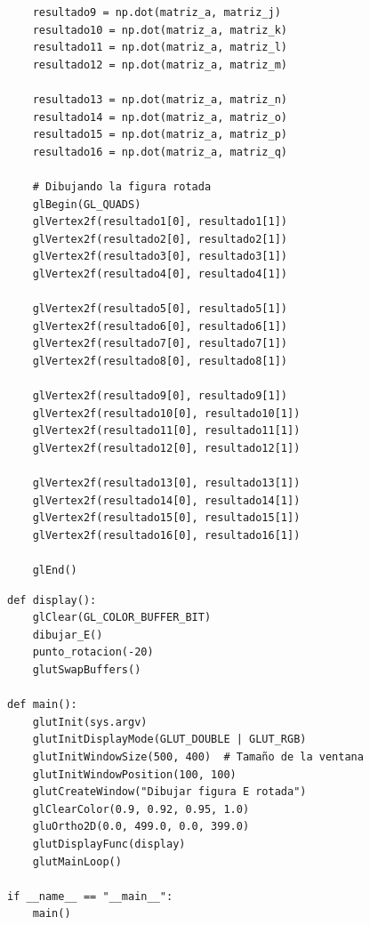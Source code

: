 \documentclass[a4paper]{article}
\begin{document}
\newpage
\begin{center}
\begin{mycodeboxl}
\begin{lstlisting}
    resultado9 = np.dot(matriz_a, matriz_j)
    resultado10 = np.dot(matriz_a, matriz_k)
    resultado11 = np.dot(matriz_a, matriz_l)
    resultado12 = np.dot(matriz_a, matriz_m)

    resultado13 = np.dot(matriz_a, matriz_n)
    resultado14 = np.dot(matriz_a, matriz_o)
    resultado15 = np.dot(matriz_a, matriz_p)
    resultado16 = np.dot(matriz_a, matriz_q)

    # Dibujando la figura rotada
    glBegin(GL_QUADS)
    glVertex2f(resultado1[0], resultado1[1])  
    glVertex2f(resultado2[0], resultado2[1])  
    glVertex2f(resultado3[0], resultado3[1])  
    glVertex2f(resultado4[0], resultado4[1])  

    glVertex2f(resultado5[0], resultado5[1])  
    glVertex2f(resultado6[0], resultado6[1])  
    glVertex2f(resultado7[0], resultado7[1])  
    glVertex2f(resultado8[0], resultado8[1])  
    
    glVertex2f(resultado9[0], resultado9[1])  
    glVertex2f(resultado10[0], resultado10[1])
    glVertex2f(resultado11[0], resultado11[1])
    glVertex2f(resultado12[0], resultado12[1])

    glVertex2f(resultado13[0], resultado13[1])
    glVertex2f(resultado14[0], resultado14[1])
    glVertex2f(resultado15[0], resultado15[1])
    glVertex2f(resultado16[0], resultado16[1])

    glEnd()
\end{lstlisting}
\end{mycodeboxl}
\end{center}
\newpage
\begin{center}
\begin{mycodeboxl}
\begin{lstlisting}
def display():
    glClear(GL_COLOR_BUFFER_BIT)
    dibujar_E()
    punto_rotacion(-20)
    glutSwapBuffers()

def main():
    glutInit(sys.argv)
    glutInitDisplayMode(GLUT_DOUBLE | GLUT_RGB)
    glutInitWindowSize(500, 400)  # Tamaño de la ventana
    glutInitWindowPosition(100, 100)
    glutCreateWindow("Dibujar figura E rotada")
    glClearColor(0.9, 0.92, 0.95, 1.0)
    gluOrtho2D(0.0, 499.0, 0.0, 399.0)
    glutDisplayFunc(display)
    glutMainLoop()

if __name__ == "__main__":
    main()
\end{lstlisting}
\end{mycodeboxl}
\end{center}
\end{document}

